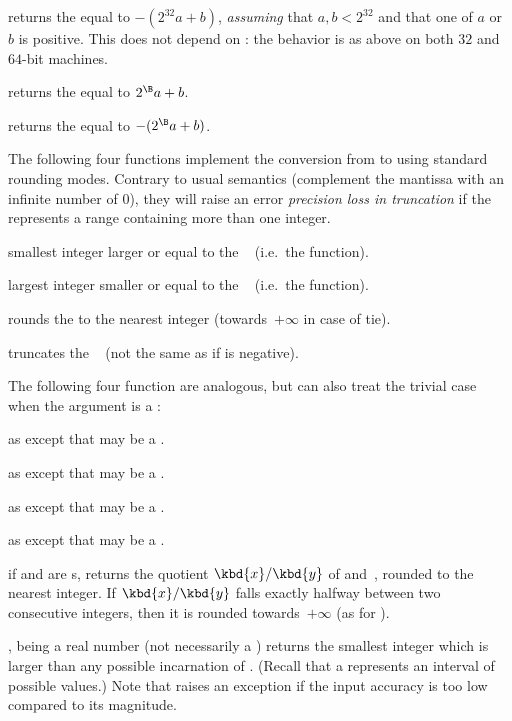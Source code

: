  returns the  equal to
$- (2^{32} a + b)$, \emph{assuming} that $a,b < 2^{32}$ and that one of $a$
or $b$ is positive. This does not depend on : the behavior
is as above on both $32$ and $64$-bit machines.

 returns the  equal to
$2^{\B} a + b$.

 returns the  equal to
$-(2^{\B} a + b)$.

The following four functions implement the conversion from  to
 using standard rounding modes. Contrary to usual semantics
(complement the mantissa with an infinite number of 0), they will raise an
error \emph{precision loss in truncation} if the  represents a
range containing more than one integer.

 smallest integer larger or equal
to the ~ (i.e.~the  function).

 largest integer smaller or equal to the
~ (i.e.~the  function).

 rounds the   to the nearest integer
(towards~$+\infty$ in case of tie).

 truncates the ~ (not the same as
 if  is negative).

The following four function are analogous, but can also treat the trivial
case when the argument is a :

as  except that  may be a .

as  except that  may be a .

as  except that  may be a .

as  except that  may be a .

 if  and  are s,
returns the quotient $\kbd{x}/\kbd{y}$ of  and~, rounded to
the nearest integer. If $\kbd{x}/\kbd{y}$ falls exactly halfway between
two consecutive integers, then it is rounded towards~$+\infty$ (as for
).

,  being a real number (not necessarily a
) returns the smallest integer which is larger than any possible
incarnation of . (Recall that a  represents an interval of
possible values.) Note that  raises an exception if the input
accuracy is too low compared to its magnitude.

